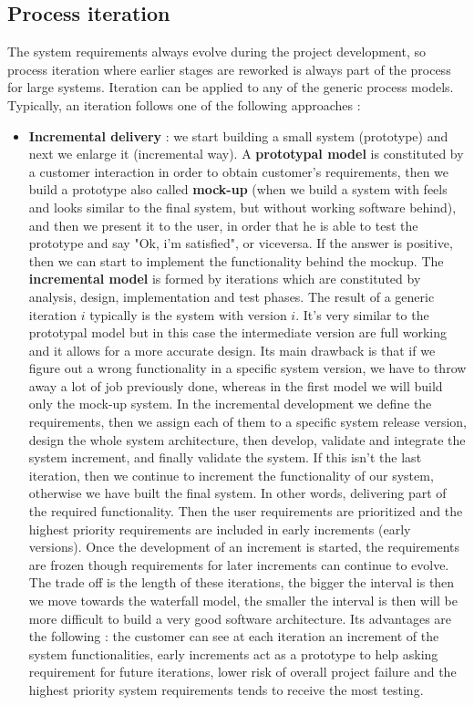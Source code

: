\documentclass[11pt]{article}
\begin{document}
\subsection{Process iteration}
The system requirements always evolve during the project development, so process iteration where earlier stages are reworked is always part of the process for large systems. Iteration can be applied to any of the generic process models. Typically, an iteration follows one of the following approaches :
\begin{itemize}
\item \textbf{Incremental delivery} : we start building a small system (prototype) and next we enlarge it (incremental way). A \textbf{prototypal model} is constituted by a customer interaction in order to obtain customer's requirements, then we build a prototype also called \textbf{mock-up}  (when we build a system with feels and looks similar to the final system, but without working software behind), and then we present it to the user, in order that he is able to test the prototype and say "Ok, i'm satisfied", or viceversa. If the answer is positive, then we can start to implement the functionality behind the mockup. The \textbf{incremental model} is formed by iterations which are constituted by analysis, design, implementation and test phases. The result of a generic iteration $i$ typically is the system with version $i$. It's very similar to the prototypal model but in this case the intermediate version are full working and it allows for a more accurate design. Its main drawback is that if we figure out a wrong functionality in a specific system version, we have to throw away a lot of job previously done, whereas in the first model we will build only the mock-up system. In the incremental development we define the requirements, then we assign each of them to a specific system release version, design the whole system architecture, then develop, validate and integrate the system increment, and finally validate the system. If this isn't the last iteration, then we continue to increment the functionality of our system, otherwise we have built the final system. In other words, delivering part of the required functionality. Then the user requirements are prioritized and the highest priority requirements are included in early increments (early versions). Once the development of an increment is started, the requirements are frozen though requirements for later increments can continue to evolve. The trade off is the length of these iterations, the bigger the interval is then we move towards the waterfall model, the smaller the interval is then will be more difficult to build a very good software architecture. Its advantages are the following : the customer can see at each iteration an increment of the system functionalities, early increments act as a prototype to help asking requirement for future iterations, lower risk of overall project failure and the highest priority system requirements tends to receive the most testing.

\end{itemize}
\end{document}
